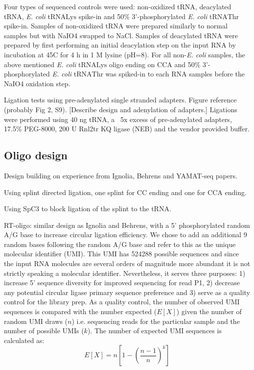 \documentclass[9pt,lineno]{elife}
\begin{document}
Four types of sequenced controls were used: non-oxidized tRNA, deacylated tRNA, \textit{E. coli} tRNA$\text{Lys}$ spike-in and 50\% 3'-phosphorylated \textit{E. coli} tRNA$\text{Thr}$ spike-in.
Samples of non-oxidized tRNA were prepared similarly to normal samples but with NaIO4 swapped to NaCl.
Samples of deacylated tRNA were prepared by first performing an initial deacylation step on the input RNA by incubation at 45C for 4 h in 1 M lysine (pH=8).
For all non-\textit{E. coli} samples, the above mentioned \textit{E. coli} tRNA$\text{Lys}$ oligo ending on CCA and 50\% 3'-phosphorylated \textit{E. coli} tRNA$\text{Thr}$ was spiked-in to each RNA samples before the NaIO4 oxidation step.


Ligation tests using pre-adenylated single stranded adapters.
Figure reference (probably Fig 2, S9).
[Describe design and adenylation of adapters.]
Ligations were performed using 40 ng tRNA, a ~5x excess of pre-adenylated adapters, 17.5\% PEG-8000, 200 U Rnl2tr KQ ligase (NEB) and the vendor provided buffer.





\subsection*{Oligo design}
Design building on experience from Ignolia, Behrens and YAMAT-seq papers.

Using splint directed ligation, one splint for CC ending and one for CCA ending.

Using SpC3 to block ligation of the splint to the tRNA.

RT-oligo: similar design as Ignolia and Behrens, with a 5' phosphorylated random A/G base to increase circular ligation efficiency.
We chose to add an additional 9 random bases following the random A/G base and refer to this as the unique molecular identifier (UMI).
This UMI has 524288 possible sequences and since the input RNA molecules are several orders of magnitude more abundant it is not strictly speaking a molecular identifier.
Nevertheless, it serves three purposes: 1) increase 5' sequence diversity for improved sequencing for read P1, 2) decrease any potential circular ligase primary sequence preference and 3) serve as a quality control for the library prep.
As a quality control, the number of observed UMI sequences is compared with the number expected ($E[X]$) given the number of random UMI draws ($n$) i.e. sequencing reads for the particular sample and the number of possible UMIs ($k$).
The number of expected UMI sequences is calculated as:
$$
E[X] = n \left[ 1 - \left(\frac{n-1}{n} \right)^k \right]
$$
\end{document}
